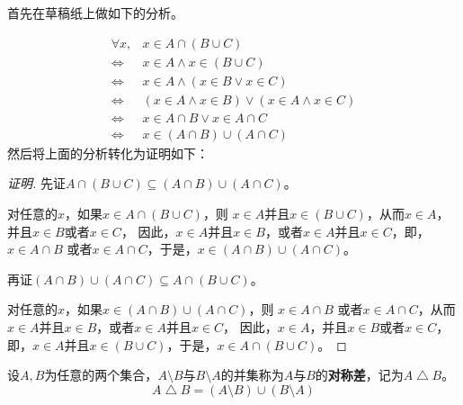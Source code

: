   首先在草稿纸上做如下的分析。

  \begin{equation*}
    \begin{split}
      \forall x, &x \in A \cap (B \cup C) \\
      \Leftrightarrow& x \in A \land x \in (B \cup C)\\
      \Leftrightarrow& x \in A \land (x \in B \lor x \in C)\\
      \Leftrightarrow& (x \in A \land x \in B) \lor (x \in A \land x \in C)\\
      \Leftrightarrow& x \in A \cap B \lor x \in A \cap C\\
      \Leftrightarrow& x \in (A \cap B) \cup (A \cap C)
    \end{split}
  \end{equation*}
  然后将上面的分析转化为证明如下：  
\begin{proof}[证明]
  先证$A \cap (B \cup C) \subseteq (A \cap B) \cup (A \cap C)$。

  对任意的$x$，如果$x \in A \cap (B \cup C)$，则 $x \in A$并且$x \in (B \cup C)$，从而$x \in A$，并且$x \in B$或者$ x \in C$，
  因此，$x \in A$并且$x \in B$，或者$x \in A$并且$ x \in C$，即，$x \in A \cap B$ 或者$x \in A \cap C$，于是，$x \in (A \cap B) \cup (A \cap C)$。

  再证$(A \cap B) \cup (A \cap C) \subseteq A \cap (B \cup C)$。

    对任意的$x$，如果$x \in (A \cap B) \cup (A \cap C)$，则 $x \in A \cap B$ 或者$x \in A \cap C$，从而$x \in A$并且$x \in B$，或者$x \in A$并且$ x \in C$，
  因此，$x \in A$，并且$x \in B$或者$ x \in C$，即，$x \in A$并且$x \in (B \cup C)$，于是，$x \in A \cap (B \cup C)$。

\end{proof}
{\flushleft
\begin{minipage}{0.69\linewidth}
  \begin{Def}
    设$A,B$为任意的两个集合，$A\setminus B$与$B\setminus A$的并集称为$A$与$B$的{\bfseries 对称差}，记为$A \bigtriangleup B$。
    \begin{equation*}
      A\bigtriangleup B = (A \setminus B) \cup (B \setminus A)
    \end{equation*}
  \end{Def}
\end{minipage}
\begin{minipage}{0.29\linewidth}
  \end{minipage}}
